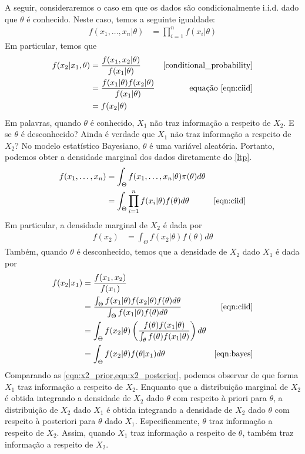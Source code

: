 A seguir, consideraremos o caso em que os dados
são condicionalmente i.i.d. dado que 
$\theta$ é conhecido.
Neste caso, temos a seguinte igualdade:
\begin{align}
 \label{eqn:ciid}
 f(x_{1},\ldots,x_{n}|\theta) 
 &= \prod_{i=1}^{n}{f(x_{i}|\theta)}
\end{align}
Em particular, temos que
\begin{align*}
 f(x_{2}|x_{1},\theta)
 &= \frac{f(x_{1},x_{2}|\theta)}{f(x_{1}|\theta)}
 & \text{\cref{conditional_probability}} \\
 &= \frac{f(x_{1}|\theta)f(x_{2}|\theta)}
 {f(x_{1}|\theta)}
 & \text{equação \ref{eqn:ciid}} \\
 &= f(x_{2}|\theta)
\end{align*}
Em palavras, quando $\theta$ é conhecido,
$X_{1}$ não traz informação a respeito de $X_{2}$.
E se $\theta$ é desconhecido?
Ainda é verdade que $X_{1}$ não traz 
informação a respeito de $X_{2}$?
No modelo estatístico Bayesiano, 
$\theta$ é uma variável aleatória.
Portanto, podemos obter a densidade marginal dos dados
diretamente do \cref{ltp}.
\begin{align}
 f(x_{1},\ldots,x_{n})	&= \int_{\Theta}
 {f(x_{1},\ldots,x_{n}|\theta)\pi(\theta)d\theta}			
 & \nonumber \\
 &= \int_{\Theta}{\prod_{i=1}^{n}
 {f(x_{i}|\theta)}f(\theta)d\theta}
 & \text{\cref{eqn:ciid}}
\end{align}
Em particular, a densidade marginal de 
$X_{2}$ é dada por
\begin{align}
 \label{eqn:x2_prior}
 f(x_{2})
 &= \int_{\Theta}{f(x_{2}|\theta)f(\theta)d\theta}
\end{align}
Também, quando $\theta$ é desconhecido, temos que 
a densidade de $X_{2}$ dado $X_{1}$ é dada por
\begin{align}
 \label{eqn:x2_posterior}
 f(x_{2}|x_{1})	
 &= \frac{f(x_{1},x_{2})}{f(x_{1})} \nonumber \\
 &= \frac{\int_{\Theta}
 {f(x_{1}|\theta)f(x_{2}|\theta)f(\theta)d\theta}}
 {\int_{\Theta}{f(x_{1}|\theta)f(\theta)d\theta}}
 & \text{\cref{eqn:ciid}} \nonumber	\\
 &= \int_{\Theta}
 {f(x_{2}|\theta)\left(\frac{f(\theta)f(x_{1}|\theta)}
 {\int_{\theta}{f(\theta)f(x_{1}|\theta)}}\right)d\theta}	
 \nonumber \\
 &= \int_{\Theta}{f(x_{2}|\theta)f(\theta|x_{1})d\theta}
 & \text{\cref{eqn:bayes}}
\end{align}
Comparando as \cref{eqn:x2_prior,eqn:x2_posterior},
podemos observar de que forma $X_{1}$ traz 
informação a respeito de $X_{2}$.
Enquanto que a distribuição marginal de $X_{2}$ é 
obtida integrando a densidade de $X_{2}$ dado $\theta$ 
com respeito à priori para $\theta$,
a distribuição de $X_{2}$ dado $X_{1}$ é obtida
integrando a densidade de $X_{2}$ dado $\theta$ com
respeito à posteriori para $\theta$ dado $X_{1}$.
Especificamente, $\theta$ traz informação a
respeito de $X_{2}$.
Assim, quando $X_{1}$ traz informação a
respeito de $\theta$, também traz 
informação a respeito de $X_{2}$.

